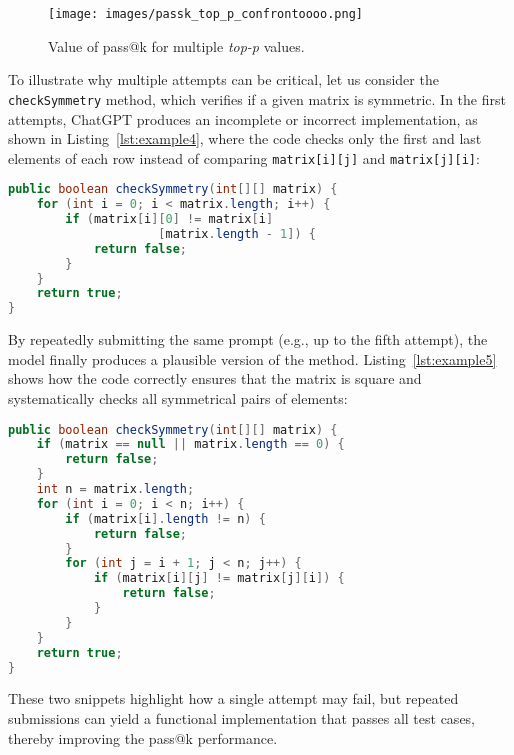 \begin{figure}[ht]
        \centering
        \texttt{[image: images/passk\_top\_p\_confrontoooo.png]}
        \caption{Value of pass@k for multiple \textit{top-p} values.}
        \label{fig:passKTopP}
\end{figure}

To illustrate why multiple attempts can be critical, let us consider the \texttt{checkSymmetry} method, which verifies if a given matrix is symmetric. In the first attempts, ChatGPT produces an incomplete or incorrect implementation, as shown in Listing~\ref{lst:example4}, where the code checks only the first and last elements of each row instead of comparing \texttt{matrix[i][j]} and \texttt{matrix[j][i]}:

\begin{lstlisting}[language=Java, xleftmargin=.12in, label=lst:example4, 
caption=Example of an incorrect implementation of\\ \texttt{checkSymmetry} in the early attempts.]
public boolean checkSymmetry(int[][] matrix) {
    for (int i = 0; i < matrix.length; i++) {
        if (matrix[i][0] != matrix[i]
                     [matrix.length - 1]) {
            return false;
        }
    }
    return true;
}
\end{lstlisting}

By repeatedly submitting the same prompt (e.g., up to the fifth attempt), the model finally produces a plausible version of the method. Listing~\ref{lst:example5} shows how the code correctly ensures that the matrix is square and systematically checks all symmetrical pairs of elements:
\begin{lstlisting}[language=Java, xleftmargin=.18in, label=lst:example5, 
caption=Plausible implementation of \texttt{checkSymmetry} obtained after\\ five attempts.]
public boolean checkSymmetry(int[][] matrix) {
    if (matrix == null || matrix.length == 0) {
        return false;
    }
    int n = matrix.length;
    for (int i = 0; i < n; i++) {
        if (matrix[i].length != n) {
            return false;
        }
        for (int j = i + 1; j < n; j++) {
            if (matrix[i][j] != matrix[j][i]) {
                return false;
            }
        }
    }
    return true;
}
\end{lstlisting}

These two snippets highlight how a single attempt may fail, but repeated submissions can yield a functional implementation that passes all test cases, thereby improving the pass@k performance.


